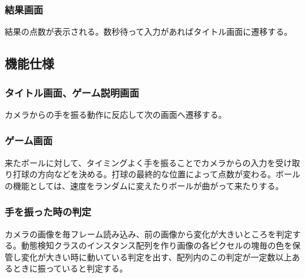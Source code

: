 \documentclass{jsarticle}
\begin{document}
\subsubsection{結果画面}
結果の点数が表示される。数秒待って入力があればタイトル画面に遷移する。
\subsection{機能仕様}
\subsubsection{タイトル画面、ゲーム説明画面}
カメラからの手を振る動作に反応して次の画面へ遷移する。
\subsubsection{ゲーム画面}
来たボールに対して、タイミングよく手を振ることでカメラからの入力を受け取り打球の方向などを決める。打球の最終的な位置によって点数が変わる。ボールの機能としては、速度をランダムに変えたりボールが曲がって来たりする。
\subsubsection{手を振った時の判定}
カメラの画像を毎フレーム読み込み、前の画像から変化が大きいところを判定する。動態検知クラスのインスタンス配列を作り画像の各ピクセルの塊毎の色を保管し変化が大きい時に動いている判定を出す、配列内のこの判定が一定数以上あるときに振っていると判定する。
\end{document}
